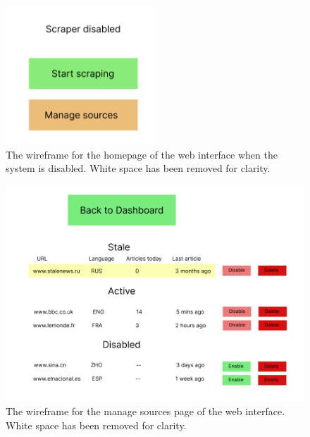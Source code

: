 \documentclass{l4proj}
\begin{document}
\begin{appendices}
 \begin{figure}[h]
\centering
\includegraphics[width=0.5\textwidth]{images/wireframe-home-2.png}
\caption{The wireframe for the homepage of the web interface when the system is disabled. White space has been removed for clarity.}
\label{fig:interface-wireframe}
\end{figure}

 \begin{figure}[h]
\centering
\includegraphics[width=\textwidth]{images/interface-wireframe-sources.png}
\caption{The wireframe for the manage sources page of the web interface. White space has been removed for clarity.}
\label{fig:interface-wireframe}
\end{figure}


\end{appendices}
\end{document}
